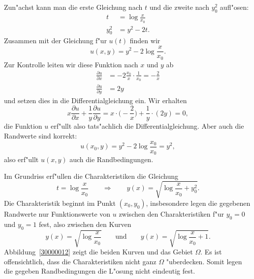 \begin{loesung}
\begin{teilaufgaben}
Zun"achst kann man die erste Gleichung nach $t$ und die zweite nach $y_0^2$
aufl"osen: 
\begin{align*}
t&=\log\frac{x}{x_0}\\
y_0^2&=y^2-2t.
\end{align*}
Zusammen mit der Gleichung f"ur $u(t)$ finden wir
\[
u(x,y) = y^2 - 2\log\frac{x}{x_0}.
\]
Zur Kontrolle leiten wir diese Funktion nach $x$ und $y$ ab
\begin{align*}
\frac{\partial u}{\partial x}
&=
-2\frac{x_0}{x}\cdot\frac1{x_0}=-\frac2x
\\
\frac{\partial u}{\partial y}
&=
2y
\end{align*}
und setzen dies in die Differentialgleichung ein.
Wir erhalten
\[
x\frac{\partial u}{\partial x} + \frac1y\frac{\partial u}{\partial y}
=
x\cdot \biggl(-\frac{2}{x}\biggr)
+ \frac1y\cdot (2y)
=
0,
\]
die Funktion $u$ erf"ullt also tats"achlich die Differentialgleichung.
Aber auch die Randwerte sind korrekt:
\[
u(x_0,y)=y^2-2\log\frac{x_0}{x_0}=y^2,
\]
also erf"ullt $u(x,y)$ auch die Randbedingungen.
\item
Im Grundriss erf"ullen die Charakteristiken die Gleichung
\[
t = \log\frac{x}{x_0}
\qquad\Rightarrow\qquad
y(x)=\sqrt{\log\frac{x}{x_0}+y_0^2}.
\]
Die Charakteristik beginnt im Punkt $(x_0,y_0)$, insbesondere legen die
gegebenen Randwerte nur Funktionswerte von $u$ zwischen den Charakteristiken
f"ur $y_0=0$ und $y_0=1$ fest, also zwischen den Kurven
\[
y(x) = \sqrt{\log\frac{x}{x_0}}
\qquad\text{und}\qquad
y(x) = \sqrt{\log\frac{x}{x_0}+1}.
\]
Abbildung~\ref{30000012} zeigt die beiden Kurven und das Gebiet $\Omega$.
Es ist offensichtlich, dass die Charakteristiken nicht ganz $\Omega$
"uberdecken.
Somit legen die gegeben Randbedingungen die L"osung nicht eindeutig fest.
\qedhere
\end{teilaufgaben}
\end{loesung}

